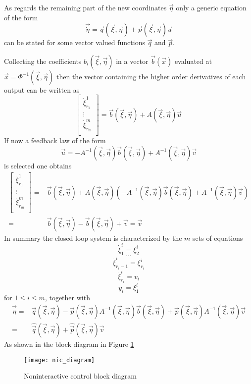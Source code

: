 As regards the remaining part of the new coordinates $\vec{\eta}$ only a generic equation of the form
\[
\vec{\dot{\eta}} = \vec{q}(\vec{\xi},\vec{\eta}) + \vec{p}(\vec{\xi},\vec{\eta})\vec{u}
\]
can be stated for some vector valued functions $\vec{q}$ and $\vec{p}$.
\par
Collecting the coefficients $b_i(\vec{\xi},\vec{\eta})$ in a vector
$\vec{b}(\vec{x})$ evaluated at $\vec{x} = \Phi^{-1}(\vec{\xi},\vec{\eta})$
then the vector containing the higher order derivatives of each output can be
written as
\[
\begin{bmatrix}
  \dot{\xi}_{r_{1}}^{1}\\
  \vdots\\
  \dot{\xi}_{r_{m}}^{m}\\
\end{bmatrix}=
\vec{b}(\vec{\xi},\vec{\eta}) + A(\vec{\xi},\vec{\eta})\vec{u}
\]
If now a feedback law of the form
\[
\vec{u} = -A^{-1}(\vec{\xi},\vec{\eta})\vec{b}(\vec{\xi},\vec{\eta}) + A^{-1}(\vec{\xi},\vec{\eta})\vec{v}
\]
is selected one obtains
\[
\begin{split}
  \begin{bmatrix}
    \dot{\xi}_{r_{1}}^{1}\\
    \vdots\\
    \dot{\xi}_{r_{m}}^{m}\\
  \end{bmatrix}=&
  \vec{b}(\vec{\xi},\vec{\eta}) + A(\vec{\xi},\vec{\eta})
  (-A^{-1}(\vec{\xi},\vec{\eta})\vec{b}(\vec{\xi},\vec{\eta}) + A^{-1}(\vec{\xi},\vec{\eta})\vec{v})\\
  =&
  \vec{b}(\vec{\xi},\vec{\eta})-\vec{b}(\vec{\xi},\vec{\eta}) + \vec{v}
  = \vec{v}
\end{split}
\]
In summary the closed loop system is characterized by the $m$ sets of equations
\[
\dot{\xi}_{1}^{i} = \xi_{2}^{i}
\]
\[
\hdots
\]
\[
\dot{\xi}_{r_{i}-1}^{i} = \xi_{r_{i}}^{i}
\]
\[
\dot{\xi}_{r_{i}}^{i} = v_{i}
\]
\[
y_{i} = \xi_{1}^{i}
\]
for $1 \le i \le m$, together with
\[
\begin{split}
  \vec{\dot{\eta}} =& \vec{q}(\vec{\xi},\vec{\eta})
  -\vec{p}(\vec{\xi},\vec{\eta})A^{-1}(\vec{\xi},\vec{\eta})\vec{b}(\vec{\xi},\vec{\eta})
  +\vec{p}(\vec{\xi},\vec{\eta})A^{-1}(\vec{\xi},\vec{\eta})\vec{v}\\
  =&\hat{\vec{q}}(\vec{\xi},\vec{\eta}) + \hat{\vec{p}}(\vec{\xi},\vec{\eta})\vec{v}
\end{split}
\]
As shown in the block diagram in Figure \ref{fig:nic_diagram}
\begin{figure}[h]
  \centering
  \texttt{[image: nic\_diagram]}
  \caption{Noninteractive control block diagram \label{fig:nic_diagram}}
\end{figure}
